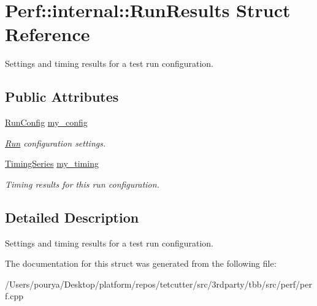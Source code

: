 \hypertarget{structPerf_1_1internal_1_1RunResults}{}\section{Perf\+:\+:internal\+:\+:Run\+Results Struct Reference}
\label{structPerf_1_1internal_1_1RunResults}


Settings and timing results for a test run configuration.  


\subsection*{Public Attributes}
\begin{DoxyCompactItemize}
\item 
\hypertarget{structPerf_1_1internal_1_1RunResults_ab42345edfd91637c7aba4ade3ba0c0d2}{}\hyperlink{structPerf_1_1internal_1_1RunConfig}{Run\+Config} \hyperlink{structPerf_1_1internal_1_1RunResults_ab42345edfd91637c7aba4ade3ba0c0d2}{my\+\_\+config}\label{structPerf_1_1internal_1_1RunResults_ab42345edfd91637c7aba4ade3ba0c0d2}

\begin{DoxyCompactList}\small\item\em \hyperlink{structRun}{Run} configuration settings. \end{DoxyCompactList}\item 
\hypertarget{structPerf_1_1internal_1_1RunResults_aec2d41b868755f0ebf33bf8c7994fabe}{}\hyperlink{structPerf_1_1internal_1_1TimingSeries}{Timing\+Series} \hyperlink{structPerf_1_1internal_1_1RunResults_aec2d41b868755f0ebf33bf8c7994fabe}{my\+\_\+timing}\label{structPerf_1_1internal_1_1RunResults_aec2d41b868755f0ebf33bf8c7994fabe}

\begin{DoxyCompactList}\small\item\em Timing results for this run configuration. \end{DoxyCompactList}\end{DoxyCompactItemize}


\subsection{Detailed Description}
Settings and timing results for a test run configuration. 

The documentation for this struct was generated from the following file\+:\begin{DoxyCompactItemize}
\item 
/\+Users/pourya/\+Desktop/platform/repos/tetcutter/src/3rdparty/tbb/src/perf/perf.\+cpp\end{DoxyCompactItemize}
